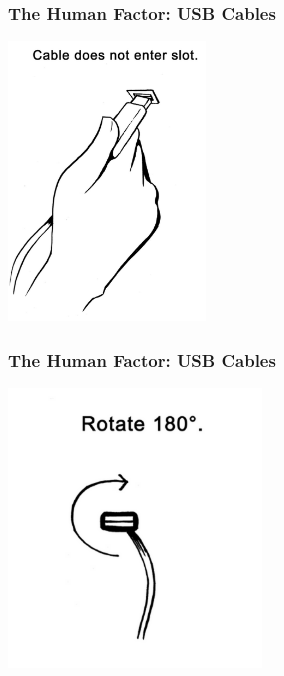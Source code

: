 \begin{frame}
\frametitle{The Human Factor: USB Cables}
\begin{changemargin}{1cm}

\vspace{-0.5em}
\begin{center}
	\includegraphics[height=20em]{images/usb3.png}\\
\end{center}

\end{changemargin}
\end{frame}


\begin{frame}
\frametitle{The Human Factor: USB Cables}
\begin{changemargin}{1cm}

\vspace{-0.5em}
\begin{center}
	\includegraphics[height=20em]{images/usb4.png}\\
\end{center}

\end{changemargin}
\end{frame}


